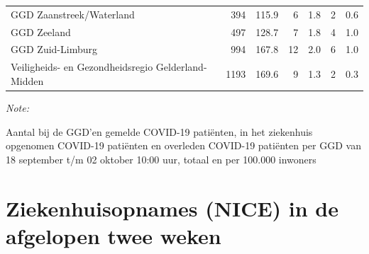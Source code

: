 \documentclass[
  english,
  man,floatsintext]{apa6}
\begin{document}
\begin{table}
\begin{threeparttable}
\begin{tabular}{lrrrrrr}
GGD Zaanstreek/Waterland & 394 & 115.9 & 6 & 1.8 & 2 & 0.6\\
GGD Zeeland & 497 & 128.7 & 7 & 1.8 & 4 & 1.0\\
GGD Zuid-Limburg & 994 & 167.8 & 12 & 2.0 & 6 & 1.0\\
Veiligheids- en Gezondheidsregio Gelderland-Midden & 1193 & 169.6 & 9 & 1.3 & 2 & 0.3\\
\bottomrule
\end{tabular}
\begin{tablenotes}
\item \textit{Note: } 
\item Aantal bij de GGD’en gemelde COVID-19 patiënten, in het ziekenhuis opgenomen COVID-19 patiënten en overleden COVID-19 patiënten per GGD van 18 september t/m 02 oktober 10:00 uur, totaal en per 100.000 inwoners
\end{tablenotes}
\end{threeparttable}
\endgroup{}
\end{table}

\newpage

\hypertarget{ziekenhuisopnames-nice-in-de-afgelopen-twee-weken}{%
\section{Ziekenhuisopnames (NICE) in de afgelopen twee weken}\label{ziekenhuisopnames-nice-in-de-afgelopen-twee-weken}}
\end{document}
